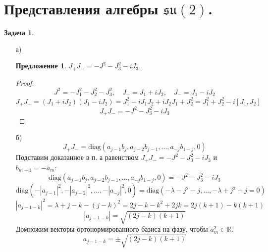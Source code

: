 \documentclass[12pt]{article}
\newtheorem{predl}[theorem]{Предложение}
\theoremstyle{definition}
\newtheorem{zad}{Задача}[section]
\begin{document}
\section{Представления алгебры $\mathfrak{su}(2)$.}
\begin{zad}
\begin{itemize}
    \item[а)]
    \begin{predl}
        $J_+J_-=-J^2-J_3^2-iJ_3$.
    \end{predl}
    \begin{proof}
        \begin{equation}
            J^2=-J_1^2-J_2^2-J_3^2,\quad J_+=J_1+iJ_2,\quad J_-=J_1-iJ_2
        \end{equation}
        \begin{equation}
            J_+J_-=(J_1+iJ_2)(J_1-iJ_2)=J_1^2-iJ_1J_2+iJ_2J_1+J_2^2=J_1^2+J_2^2-i[J_1,J_2]
        \end{equation}
        \begin{equation}
            \boxed{J_+J_-=-J^2-J_3^2-iJ_3}
        \end{equation}
    \end{proof}
    \item[б)]
    \begin{equation}
        J_+J_-=\text{diag}(a_{j-1}b_j,a_{j-2}b_{j-1},...,a_{-j}b_{1-j},0)
    \end{equation}
    Подставим доказанное в п. а равенством $J_+J_-=-J^2-J_3^2-iJ_3$ и $b_{m+1}=-\bar{a}_m$:
    \begin{equation}
        \text{diag}(a_{j-1}b_j,a_{j-2}b_{j-1},...,a_{-j}b_{1-j},0)=-J^2-J_3^2-iJ_3
    \end{equation}
    \begin{equation}
        \text{diag}(-|a_{j-1}|^2,-|a_{j-2}|^2,...,-|a_{-j}|^2,0)=\text{diag}(-\lambda-j^2-j,...,-\lambda+j^2+j=0)
    \end{equation}
    \begin{equation}
        |a_{j-1-k}|^2=\lambda+j-k-(j-k)^2=2j-k-k^2+2jk=2j(k+1)-k(k+1)
    \end{equation}
    \begin{equation}
        |a_{j-1-k}|=\sqrt{(2j-k)(k+1)}
    \end{equation}
    Домножим векторы ортонормированного базиса на фазу, чтобы $a_m^2\in\mathbb{R}$.
    \begin{equation}
        \boxed{a_{j-1-k}=\pm\sqrt{(2j-k)(k+1)}}
    \end{equation}
\end{itemize}
\end{zad}
\end{document}

